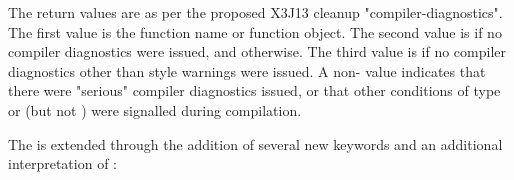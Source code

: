 The return values are as per the proposed X3J13 cleanup
"compiler-diagnostics".  The first value is the function name or
function object.  The second value is \false{} if no compiler
diagnostics were issued, and \true{} otherwise.  The third value is
\false{} if no compiler diagnostics other than style warnings were
issued.  A non-\false{} value indicates that there were "serious"
compiler diagnostics issued, or that other conditions of type
 or  (but not
) were signalled during compilation.
\enddefun


The \cmucl{}  is extended through the addition of several new
keywords and an additional interpretation of :
